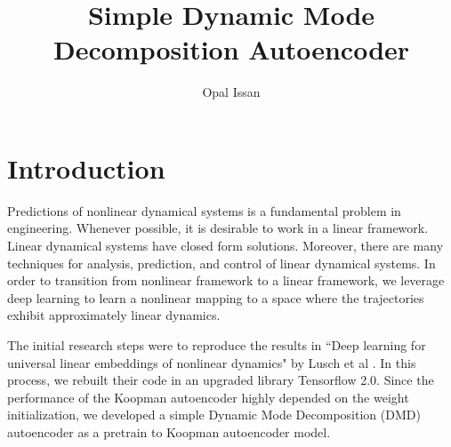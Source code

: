 \documentclass[twocolumn, letterpaper]{scrartcl}
\begin{document}
    \title{Simple Dynamic Mode Decomposition Autoencoder}
    \author{Opal Issan}
    \date{}
	


\section*{\fontsize{15}{15} \textbf{Introduction}}
    Predictions of nonlinear dynamical systems is a fundamental problem in engineering. Whenever possible, it is desirable to work in a linear framework. Linear dynamical systems have closed form solutions. Moreover, there are many techniques for analysis, prediction, and control of linear dynamical systems. In order to transition from nonlinear framework to a linear framework, we leverage deep learning to learn a nonlinear mapping to a space where the trajectories exhibit approximately linear dynamics. 
    
    The initial research steps were to reproduce the results in ``Deep learning for universal linear embeddings of nonlinear dynamics" by Lusch et al \cite{Lusch}. In this process, we rebuilt their code in an upgraded library Tensorflow 2.0. Since the performance of the Koopman autoencoder highly depended on the weight initialization, we developed a simple Dynamic Mode Decomposition (DMD) autoencoder as a pretrain to Koopman autoencoder model. 
\end{document}
